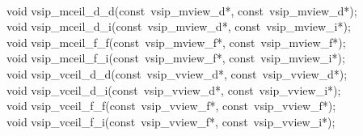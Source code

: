 \\\cvsiplh
\begin{cfuncs}
void vsip\_mceil\_d\_d(const~vsip\_mview\_d*, const~vsip\_mview\_d*);\Bs\\
void vsip\_mceil\_d\_i(const~vsip\_mview\_d*, const~vsip\_mview\_i*);\Bs\\
void vsip\_mceil\_f\_f(const~vsip\_mview\_f*, const~vsip\_mview\_f*);\Bs\\
void vsip\_mceil\_f\_i(const~vsip\_mview\_f*, const~vsip\_mview\_i*);\Bs\\
void vsip\_vceil\_d\_d(const~vsip\_vview\_d*, const~vsip\_vview\_d*);\Bs\\
void vsip\_vceil\_d\_i(const~vsip\_vview\_d*, const~vsip\_vview\_i*);\Bs\\
void vsip\_vceil\_f\_f(const~vsip\_vview\_f*, const~vsip\_vview\_f*);\Bs\\
void vsip\_vceil\_f\_i(const~vsip\_vview\_f*, const~vsip\_vview\_i*);\Bs\\
\end{cfuncs}
\pyjvsiph
{}